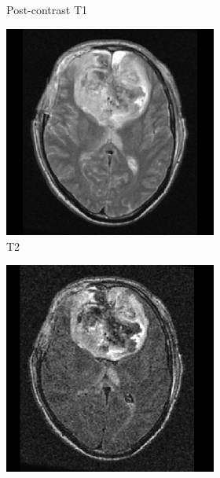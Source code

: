 \begin{figure}[htbp]
\begin{subfigure}[b]{\textwidth}
\begin{subfigure}[b]{0.24\textwidth}
    \caption*{Post-contrast \acrshort{T1}}
    \end{subfigure}
    \hfill
    \begin{subfigure}[b]{0.24\textwidth}
    \includegraphics[width=\textwidth, clip, trim=2.5cm 0.5cm 2.5cm 0.5cm]{Figures/TCGA-DU-6410_T2.png}
    \caption*{\acrshort{T2}}
    \end{subfigure}
    \hfill
    \begin{subfigure}[b]{0.24\textwidth}
    \includegraphics[width=\textwidth, clip, trim=2.5cm 0.5cm 2.5cm 0.5cm]{Figures/TCGA-DU-6410_FLAIR.png}

\end{subfigure}
\end{subfigure}
\end{figure}
